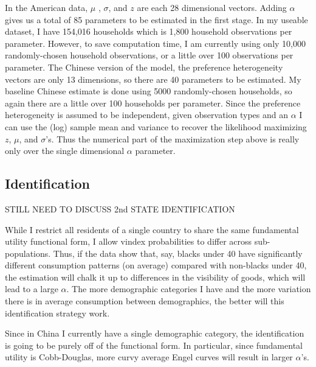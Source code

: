 \documentclass{article}
\begin{document}
In the American data, $\mu$ , $\sigma$, and $z$ are each 28 dimensional vectors. Adding $\alpha$ gives us a total of 85 parameters to be estimated in the first stage.   
In my useable dataset, I have 154,016 households which is 1,800 household observations per parameter.
However, to save computation time, I am currently using only 10,000 randomly-chosen household observations, or a little over 100 observations per parameter.
The Chinese version of the model, the preference heterogeneity vectors are only 13 dimensions, so there are 40 parameters to be estimated.  My baseline Chinese estimate is done using 5000 randomly-chosen households, so again there are a little over 100 households per parameter.
Since the preference heterogeneity is assumed to be independent, given observation types and an $\alpha$ I can use the (log) sample mean and variance to recover the likelihood maximizing $z$, $\mu$, and $\sigma$'s.
Thus the numerical part of the maximization step above is really only over the single dimensional $\alpha$ parameter.
\subsection{Identification}
STILL NEED TO DISCUSS 2nd STATE IDENTIFICATION

While I restrict all residents of a single country to share the same fundamental utility functional form, I allow vindex probabilities to differ across sub-populations.  Thus, if the data show that, say, blacks under 40 have significantly different consumption patterns (on average) compared with non-blacks under 40, the estimation will chalk it up to differences in the visibility of goods, which will lead to a large $\alpha$.  The more demographic categories I have and the more variation there is in average consumption between demographics, the better will this identification strategy work. 

Since in China I currently have a single demographic category, the identification is going to be purely off of the functional form.  In particular, since fundamental utility is Cobb-Douglas, more curvy average Engel curves will result in larger $\alpha$'s.
\end{document}

